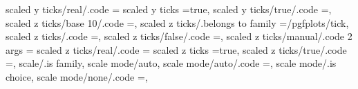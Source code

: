 {{{{scaled y ticks/real/.code                                          ={                                                                                                                                 
scaled y ticks                                                     =true,                                                                                                                              
scaled y ticks/true/.code                                          ={\def\pgfplots@scaled@ticks@y@choice{1}},                                                                                          
scaled z ticks/base 10/.code                                       ={\def\pgfplots@scaled@ticks@z@choice{2}\def\pgfplots@scaled@ticks@z@arg{#1}},                                                      
scaled z ticks/.belongs to family                                  =/pgfplots/tick,                                                                                                                    
scaled z ticks/.code                                               ={},                                                                                           
scaled z ticks/false/.code                                         ={\def\pgfplots@scaled@ticks@z@choice{0}},                                                                                          
scaled z ticks/manual/.code 2 args                                 ={                                                                                                                                 
scaled z ticks/real/.code                                          ={                                                                                                                                 
scaled z ticks                                                     =true,                                                                                                                              
scaled z ticks/true/.code                                          ={\def\pgfplots@scaled@ticks@z@choice{1}},                                                                                          
scale/.is family,
scale mode/auto,
scale mode/auto/.code                                              ={\def\pgfplots@scale@mode@choice{0}},                                                                                              
scale mode/.is choice,
scale mode/none/.code                                              ={\def\pgfplots@scale@mode@choice{1}},                                                                                              
}}}}}}}
